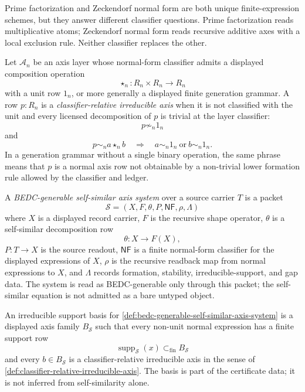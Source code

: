 \begin{principle}
\label{prin:prime-zeckendorf-normal-forms-complementary}
Prime factorization and Zeckendorf normal form are both unique
finite-expression schemes, but they answer different classifier
questions. Prime factorization reads multiplicative atoms; Zeckendorf
normal form reads recursive additive axes with a local exclusion rule.
Neither classifier replaces the other.
\end{principle}

\begin{definition}
\label{def:classifier-relative-irreducible-axis}
Let $\mathcal A_n$ be an axis layer whose normal-form classifier admits
a displayed composition operation
$$
\star_n:R_n\times R_n\to R_n
$$
with a unit row $1_n$, or more generally a displayed finite generation
grammar. A row $p:R_n$ is a \emph{classifier-relative irreducible axis}
when it is not classified with the unit and every licensed
decomposition of $p$ is trivial at the layer classifier:
$$
p\not\sim_n 1_n
$$
and
$$
p\sim_n a\star_n b
\quad\Longrightarrow\quad
a\sim_n 1_n\ \text{or}\ b\sim_n 1_n.
$$
In a generation grammar without a single binary operation, the same
phrase means that $p$ is a normal axis row not obtainable by a
non-trivial lower formation rule allowed by the classifier and ledger.
\end{definition}

\begin{definition}
\label{def:bedc-generable-self-similar-axis-system}
A \emph{BEDC-generable self-similar axis system} over a source carrier
$T$ is a packet
$$
\mathcal S
=
(X,F,\theta,P,\mathsf{NF},\rho,\Lambda)
$$
where $X$ is a displayed record carrier, $F$ is the recursive shape
operator, $\theta$ is a self-similar decomposition row
$$
\theta:X\to F(X),
$$
$P:T\to X$ is the source readout, $\mathsf{NF}$ is a finite normal-form
classifier for the displayed expressions of $X$, $\rho$ is the recursive
readback map from normal expressions to $X$, and $\Lambda$ records
formation, stability, irreducible-support, and gap data. The system is
read as BEDC-generable only through this packet; the self-similar
equation is not admitted as a bare untyped object.
\end{definition}

\begin{definition}
\label{def:irreducible-support-basis}
An irreducible support basis for
\autoref{def:bedc-generable-self-similar-axis-system} is a displayed
axis family $B_{\mathcal S}$ such that every non-unit normal expression
has a finite support row
$$
\operatorname{supp}_{\mathcal S}(x)\subset_{\mathrm{fin}}B_{\mathcal S}
$$
and every $b\in B_{\mathcal S}$ is a
classifier-relative irreducible axis in the sense of
\autoref{def:classifier-relative-irreducible-axis}. The basis is part of
the certificate data; it is not inferred from self-similarity alone.
\end{definition}

